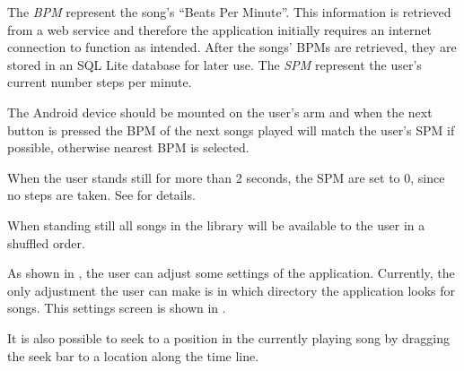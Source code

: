 The \textit{BPM} represent the song's ``Beats Per Minute''. This information is retrieved from a web service and therefore the application initially requires an internet connection to function as intended. After the songs' BPMs are retrieved, they are stored in an SQL Lite database for later use. The \textit{SPM} represent the user's current number steps per minute.

The Android device should be mounted on the user's arm and when the next button is pressed the BPM of the next songs played will match the user's SPM if possible, otherwise nearest BPM is selected.

When the user stands still for more than 2 seconds, the SPM are set to 0, since no steps are taken. See  for details. 

When standing still all songs in the library will be available to the user in a shuffled order.

As shown in , the user can adjust some settings of the application. Currently, the only adjustment the user can make is in which directory the application looks for songs. This settings screen is shown in . 

It is also possible to seek to a position in the currently playing song by dragging the seek bar to a location along the time line. 


